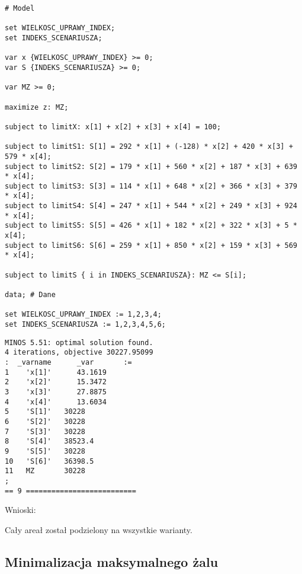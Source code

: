 \documentclass{article}
\begin{document}
\lstset{language=AMPL}
\begin{lstlisting}[caption={Model napisany w języku AMPL},label=DescriptiveLabel]
# Model

set WIELKOSC_UPRAWY_INDEX;
set INDEKS_SCENARIUSZA;

var x {WIELKOSC_UPRAWY_INDEX} >= 0;
var S {INDEKS_SCENARIUSZA} >= 0;

var MZ >= 0;

maximize z: MZ;

subject to limitX: x[1] + x[2] + x[3] + x[4] = 100;

subject to limitS1: S[1] = 292 * x[1] + (-128) * x[2] + 420 * x[3] + 579 * x[4];
subject to limitS2: S[2] = 179 * x[1] + 560 * x[2] + 187 * x[3] + 639 * x[4];
subject to limitS3: S[3] = 114 * x[1] + 648 * x[2] + 366 * x[3] + 379 * x[4];
subject to limitS4: S[4] = 247 * x[1] + 544 * x[2] + 249 * x[3] + 924 * x[4];
subject to limitS5: S[5] = 426 * x[1] + 182 * x[2] + 322 * x[3] + 5 * x[4];
subject to limitS6: S[6] = 259 * x[1] + 850 * x[2] + 159 * x[3] + 569 * x[4];

subject to limitS { i in INDEKS_SCENARIUSZA}: MZ <= S[i];

data; # Dane

set WIELKOSC_UPRAWY_INDEX := 1,2,3,4;
set INDEKS_SCENARIUSZA := 1,2,3,4,5,6;
\end{lstlisting}

\lstset{language=AMPL}
\begin{lstlisting}[caption={Wynik modlu z solwerem MINOS.},label=DescriptiveLabel]
MINOS 5.51: optimal solution found.
4 iterations, objective 30227.95099
:  _varname      _var       :=
1    'x[1]'      43.1619
2    'x[2]'      15.3472
3    'x[3]'      27.8875
4    'x[4]'      13.6034
5    'S[1]'   30228
6    'S[2]'   30228
7    'S[3]'   30228
8    'S[4]'   38523.4
9    'S[5]'   30228
10   'S[6]'   36398.5
11   MZ       30228
;
== 9 ==========================
\end{lstlisting}

\noindent
Wnioski:

\begin{itemize}
    \itemize Cały areał został podzielony na wszystkie warianty.
\end{itemize}


\subsection{Minimalizacja maksymalnego żalu}
\end{document}
